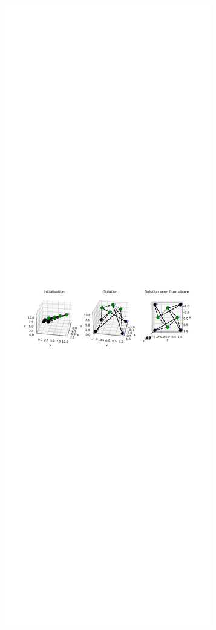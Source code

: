 \begin{figure}[!ht]
\centering
\begin{subfigure}{.72\textwidth}
  \centering
  \includegraphics[width=0.99\linewidth]{Bilder/P69.pdf}

\end{subfigure}
\end{figure}
